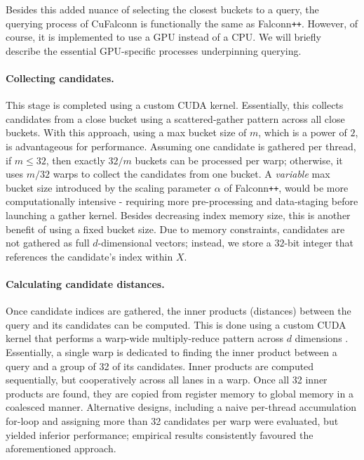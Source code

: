 \documentclass{article}
\newcommand{\cf}{CuFalconn\xspace}
\newcommand{\fpp}{Falconn\texttt{++}\xspace}
\begin{document}
Besides this added nuance of selecting the closest buckets to a query, the querying process of \cf is functionally the same as \fpp. However, of course, it is implemented to use a GPU instead of a CPU. We will briefly describe the essential GPU-specific processes underpinning querying. 

\paragraph{Collecting candidates.} 

This stage is completed using a custom CUDA kernel. Essentially, this collects candidates from a close bucket using a scattered-gather pattern across all close buckets. With this approach, using a max bucket size of $m$, which is a power of $2$, is advantageous for performance. Assuming one candidate is gathered per thread, if $m \leq 32$, then exactly $32/m$ buckets can be processed per warp; otherwise, it uses $m/32$ warps to collect the candidates from one bucket. A \emph{variable} max bucket size introduced by the scaling parameter $\alpha$ of \fpp, would be more computationally intensive - requiring more pre-processing and data-staging before launching a gather kernel. Besides decreasing index memory size, this is another benefit of using a fixed bucket size. Due to memory constraints, candidates are not gathered as full $d$-dimensional vectors; instead, we store a $32$-bit integer that references the candidate's index within $X$. 

\paragraph{Calculating candidate distances.}

Once candidate indices are gathered, the inner products (distances) between the query and its candidates can be computed. This is done using a custom CUDA kernel that performs a warp-wide multiply-reduce pattern across $d$ dimensions \cite{harris2007optimizing}. Essentially, a single warp is dedicated to finding the inner product between a query and a group of 32 of its candidates. Inner products are computed sequentially, but cooperatively across all lanes in a warp. Once all 32 inner products are found, they are copied from register memory to global memory in a coalesced manner. Alternative designs, including a naive per-thread accumulation for-loop and assigning more than 32 candidates per warp were evaluated, but yielded inferior performance; empirical results consistently favoured the aforementioned approach. 
\end{document}
